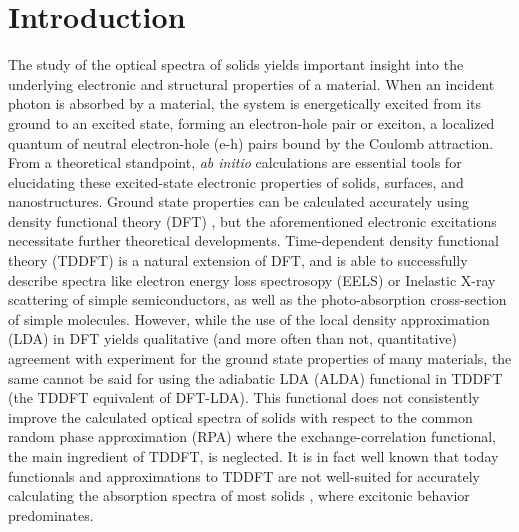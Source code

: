 \documentclass[aps,prb,10pt,showpacs,superscriptaddress,twocolumn,notitlepage]{revtex4-1}
\begin{document}
\maketitle


\section{Introduction}\label{sec:intro}

The study of the optical spectra of solids yields important insight into the
underlying electronic and structural properties of a material. When an incident
photon is absorbed by a material, the system is energetically excited from its
ground to an excited state, forming an electron-hole pair or exciton, a
localized quantum of neutral electron-hole (e-h) pairs bound by the Coulomb
attraction. From a theoretical standpoint, \emph{ab initio} calculations are
essential tools for elucidating these excited-state electronic properties of
solids, surfaces, and nanostructures. Ground state properties can be calculated
accurately using density functional theory (DFT) \cite{hohenbergPR64, kohnPR65},
but the aforementioned electronic excitations necessitate further theoretical
developments. Time-dependent density functional theory (TDDFT) \cite{rungePRL84}
is a natural extension of DFT, and is able to successfully describe spectra like
electron energy loss spectrosopy (EELS) or Inelastic X-ray scattering of simple
semiconductors, as well as the photo-absorption cross-section of simple
molecules. However, while the use of the local density approximation (LDA) in
DFT yields qualitative (and more often than not, quantitative) agreement with
experiment for the ground state properties of many materials, the same cannot be
said for using the adiabatic LDA (ALDA) functional \cite{rungePRL84} in TDDFT
(the TDDFT equivalent of DFT-LDA). This functional does not consistently improve
the calculated optical spectra of solids with respect to the common random phase
approximation (RPA) where the exchange-correlation functional, the main
ingredient of TDDFT, is neglected. It is in fact well known \cite{onidaRMP02}
that today functionals and approximations to TDDFT are not well-suited for
accurately calculating the absorption spectra of most solids
\cite{gavrilenkoPRB97, onidaRMP02}, where excitonic behavior predominates.
\end{document}
